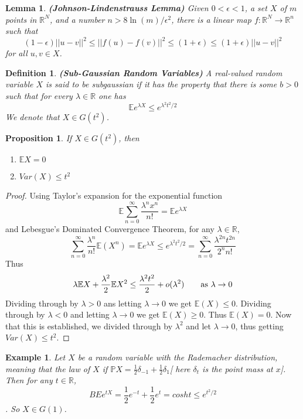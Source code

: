 \documentclass[11pt]{article}
\def\BP{{\bf P}}
\def\BR{{\mathbb R}}
\def\BE{{\mathbb E}}
\def\BP{{\mathbb P}}
\newtheorem{lemma}{Lemma}[section]
\newtheorem{definition}{Definition}[section]
\newtheorem{proposition}{Proposition}[section]
\newtheorem{example}{Example}[section]
\begin{document}
\begin{lemma}\textbf{(Johnson-Lindenstrauss Lemma)}
Given $0 < \epsilon < 1$, a set $X$ of $m$ points in $\BR^N$, and a number $n > 8 \ln(m) / \epsilon^2$, there is a linear map $f: \BR^N \to \BR^n$ such that 
\[
(1 - \epsilon) ||u - v||^2 \leq ||f(u) - f(v)||^2 \leq (1 + \epsilon) \leq (1+\epsilon) ||u - v||^2
\]
for all $u, v \in X$.
\end{lemma}

\begin{definition}\textbf{(Sub-Gaussian Random Variables)}
A real-valued random variable $X$ is said to be subgaussian if it has the property that there is some $b > 0$ such that for every $\lambda \in \BR$ one has \[
\BE e^{\lambda X} \leq e^{\lambda^2 t^2/ 2}
\]
We denote that $X \in G(t^2)$.
\end{definition}

\begin{proposition}
If $X\in G(t^2)$, then 
\begin{enumerate}
\item $\BE X = 0$
\item $Var(X) \leq t^2$
\end{enumerate}
\end{proposition}
\begin{proof}
Using Taylor's expansion for the exponential function
\[
\BE \sum_{n = 0}^\infty \frac{\lambda^n x^n}{n!} = \BE e^{\lambda X}
\] and Lebesgue's Dominated Convergence Theorem, for any $\lambda \in \BR$,
\[
\sum_{n=0}^\infty \frac{\lambda^n}{n!} \BE(X^n) = \BE e^{\lambda X} \leq e^{\lambda^2 t^2 /2 } = \sum_{n = 0}^\infty \frac{\lambda^{2n}t^{2n}}{2^n n!}
\]
Thus 
\[
\lambda \BE X + \frac{\lambda^2}{2}\BE X^2 \leq \frac{\lambda^2 t^2}{2} + o(\lambda^2)
\text{\quad\quad as $\lambda \to 0$}
\]
Dividing through by $\lambda > 0$ ans letting $\lambda \to 0$ we get $\BE (X) \leq 0$. Dividing through by $\lambda < 0$ and letting $\lambda \to 0$ we get $\BE (X) \geq 0$. Thus $\BE(X) = 0$. Now that this is established, we divided through by $\lambda^2$ and let $\lambda \to 0$, thus getting $Var(X) \leq t^2$.
\end{proof}

\begin{example}
Let $X$ be a random variable with the Rademacher distribution, meaning that the law of $X$ if $\BP X = \frac{1}{2} \delta_{-1} + \frac{1}{2} \delta_1$[ here $\delta_t$ is the point mass at $x$]. Then for any $t \in \BR$, \[BE e^{tX} = \frac{1}{2} e^{-t} + \frac{1}{2} e^t = cosh t \leq e^{t^2 / 2}\]. So $X \in G(1)$.
\end{example}
\end{document}
